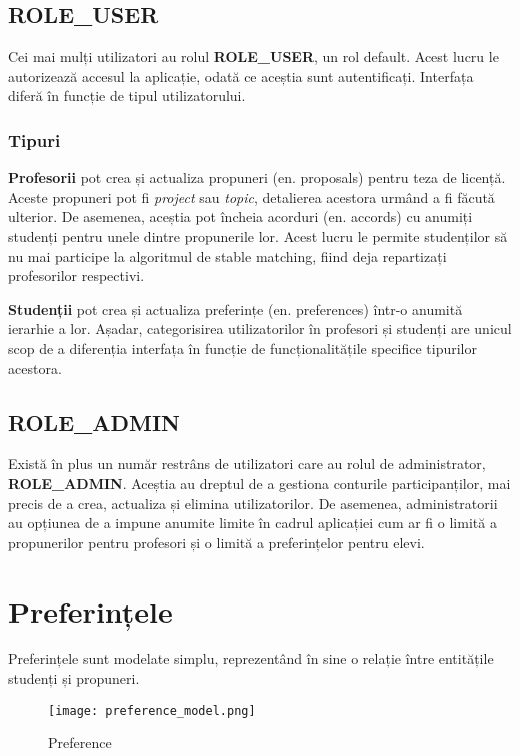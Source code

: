 \subsection{ROLE\_USER}

Cei mai mulți utilizatori au rolul \textbf{ROLE\_USER}, un rol default. Acest lucru le autorizează accesul la aplicație, odată ce aceștia sunt autentificați. Interfața diferă în funcție de tipul utilizatorului.

\subsubsection{Tipuri}

\textbf{Profesorii} pot crea și actualiza propuneri (en. proposals) pentru teza de licență. Aceste propuneri pot fi \textit{project} sau \textit{topic}, detalierea acestora urmând a fi făcută ulterior. De asemenea, aceștia pot încheia acorduri (en. accords) cu anumiți studenți pentru unele dintre propunerile lor. Acest lucru le permite studenților să nu mai participe la algoritmul de stable matching, fiind deja repartizați profesorilor respectivi.

\textbf{Studenții} pot crea și actualiza preferințe (en. preferences) într-o anumită ierarhie a lor. Așadar, categorisirea utilizatorilor în profesori și studenți are unicul scop de a diferenția interfața în funcție de funcționalitățile specifice tipurilor acestora.


\subsection{ROLE\_ADMIN}

Există în plus un număr restrâns de utilizatori care au rolul de administrator, \textbf{ROLE\_ADMIN}. Aceștia au dreptul de a gestiona conturile participanților, mai precis de a crea, actualiza și elimina utilizatorilor. De asemenea, administratorii au opțiunea de a impune anumite limite în cadrul aplicației cum ar fi o limită a propunerilor pentru profesori și o limită a preferințelor pentru elevi.

\section{Preferințele}

Preferințele sunt modelate simplu, reprezentând în sine o relație între entitățile studenți și propuneri.

\begin{figure}[H]
	\centering
	\texttt{[image: preference\_model.png]}
	\caption{Preference}
\end{figure}


